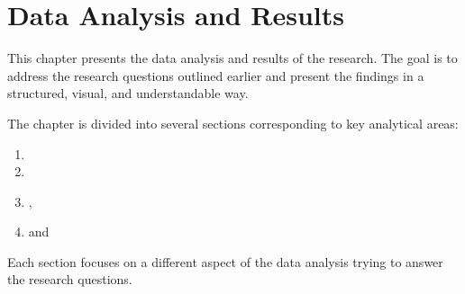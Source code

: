 \chapter{Data Analysis and Results}
\label{ch:data-analysis-and-results}

This chapter presents the data analysis and results of the research.
The goal is to address the research questions outlined earlier and present the findings in a structured, visual, and understandable way.

The chapter is divided into several sections corresponding to key analytical areas:\\
\begin{enumerate}
	\item {}
	\item {}
	\item {},
	\item and~
\end{enumerate}

Each section focuses on a different aspect of the data analysis trying to answer the research questions.

